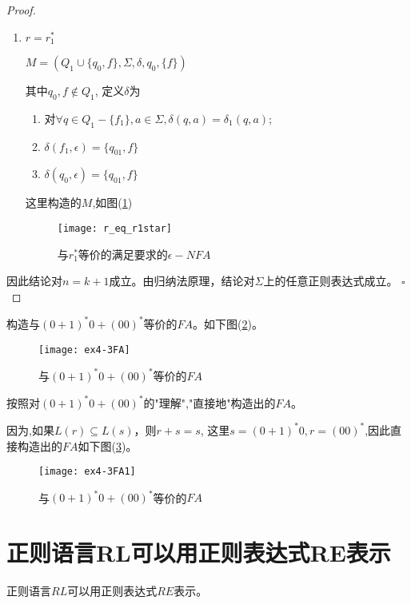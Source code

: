 \begin{proof}
\begin{enumerate}
	    \item $r=r_1^\ast$
	    
	    $M=(Q_1\cup \{q_0,f\},\Sigma,\delta,q_{0},\{f\})$
	    
	    其中$q_0,f\notin Q_1$, 定义$\delta$为
	    \begin{enumerate}
	    	\item 对$\forall q\in Q_1-\{f_1\},a\in\Sigma,\delta(q,a)=\delta_1(q,a)$;
	    	\item $\delta(f_1,\epsilon)=\{q_{01},f\}$
	    	\item $\delta(q_0,\epsilon)=\{q_{01},f\}$
	    \end{enumerate}
	    
	    这里构造的$M$,如图(\ref{fig:r_eq_r1star})
	    \begin{figure}[htbp]
	    	\texttt{[image: r\_eq\_r1star]}
	    	\caption{与$r_1^\ast$等价的满足要求的$\epsilon -NFA$}
	    	\label{fig:r_eq_r1star}       %
	    \end{figure}
	\end{enumerate} 

	因此结论对$n=k+1$成立。由归纳法原理，结论对$\Sigma$上的任意正则表达式成立。
	\hfill$\square$
\end{proof}

\begin{example}
	构造与$(0+1)^\ast 0+(00)^\ast$等价的$FA$。如下图(\ref{fig:ex4-3FA})。  
	\begin{figure}[htbp]
		\texttt{[image: ex4-3FA]}
		\caption{与$(0+1)^\ast 0+(00)^\ast$等价的$FA$}
		\label{fig:ex4-3FA}       %
	\end{figure}

	按照对$(0+1)^\ast 0+(00)^\ast$的"理解","直接地"构造出的$FA$。
	
	因为,如果$L(r)\subseteq L(s)$，则$r+s=s$, 这里$s=(0+1)^\ast 0,r=(00)^\ast$,因此直接构造出的$FA$如下图(\ref{fig:ex4-3FA1})。 
	\begin{figure}[htbp]
		\texttt{[image: ex4-3FA1]}
		\caption{与$(0+1)^\ast 0+(00)^\ast$等价的$FA$}
		\label{fig:ex4-3FA1}       %
	\end{figure}
\end{example}

\section{正则语言RL可以用正则表达式RE表示}

\begin{theorem}
	正则语言$RL$可以用正则表达式$RE$表示。
\end{theorem}

